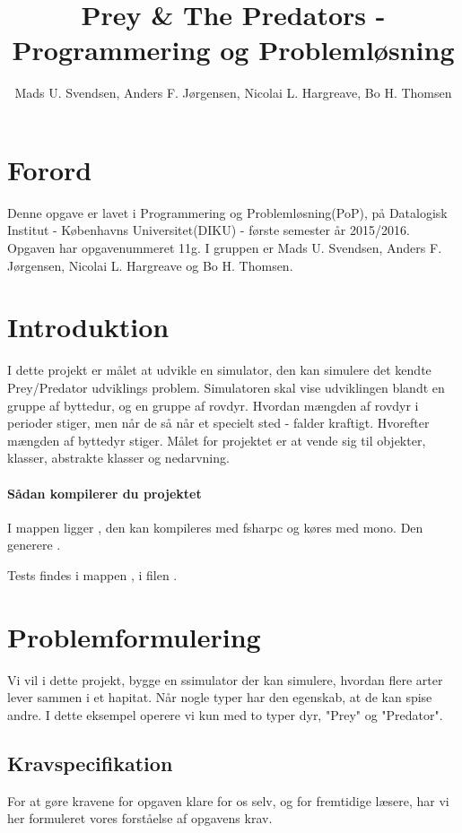 \documentclass[a4paper]{article}
\title{Prey \& The Predators - Programmering og Problemløsning}
\author{Mads U. Svendsen, Anders F. Jørgensen, Nicolai L. Hargreave, Bo H. Thomsen}
\begin{document}
	\maketitle
  \tableofcontents
\section{Forord}
  Denne opgave er lavet i Programmering og Problemløsning(PoP),
    på Datalogisk Institut - Københavns Universitet(DIKU) - første semester år 2015/2016.
    Opgaven har opgavenummeret 11g.
    I gruppen er Mads U. Svendsen, Anders F. Jørgensen, Nicolai L. Hargreave og Bo H. Thomsen.
\newpage
    
\section{Introduktion} \label{sec:introduction}
   I dette projekt er målet at udvikle en simulator,
   den kan simulere det kendte Prey/Predator udviklings problem.
   Simulatoren skal vise udviklingen blandt en gruppe af byttedur, 
   og en gruppe af rovdyr. Hvordan mængden af rovdyr i perioder stiger,
   men når de så når et specielt sted - falder kraftigt. Hvorefter mængden af byttedyr stiger.
   Målet for projektet er at vende sig til objekter, klasser, abstrakte klasser og nedarvning.

  \paragraph*{Sådan kompilerer du projektet\\}
    I  mappen ligger ,
    den kan kompileres med fsharpc og køres med mono.
    Den generere .

    Tests findes i  mappen , i filen .

\section{Problemformulering} \label{sec:problem}
  Vi vil i dette projekt, bygge en ssimulator der kan simulere,
  hvordan flere arter lever sammen i et hapitat.
  Når nogle typer har den egenskab, at de kan spise andre.
  I dette eksempel operere vi kun med to typer dyr, "Prey" og "Predator".

  \subsection{Kravspecifikation} \label{ssec:demands}
    For at gøre kravene for opgaven klare for os selv, og for fremtidige læsere,
    har vi her formuleret vores forståelse af opgavens krav.
\end{document}
